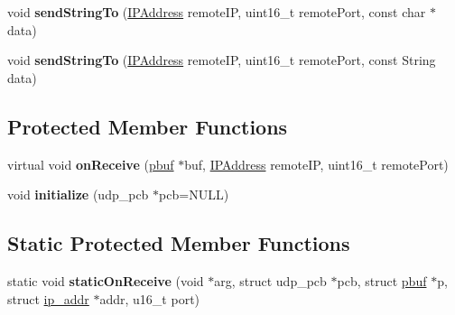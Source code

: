 \begin{DoxyCompactItemize}
\item 
\hypertarget{class_udp_connection_af6eaf8ee55a8dde7d77f0e3225692004}{}void {\bfseries send\+String\+To} (\hyperlink{class_i_p_address}{I\+P\+Address} remote\+I\+P, uint16\+\_\+t remote\+Port, const char $\ast$data)\label{class_udp_connection_af6eaf8ee55a8dde7d77f0e3225692004}

\item 
\hypertarget{class_udp_connection_a11d710290fea6107fa7b0bcc0f9a2832}{}void {\bfseries send\+String\+To} (\hyperlink{class_i_p_address}{I\+P\+Address} remote\+I\+P, uint16\+\_\+t remote\+Port, const String data)\label{class_udp_connection_a11d710290fea6107fa7b0bcc0f9a2832}

\end{DoxyCompactItemize}
\subsection*{Protected Member Functions}
\begin{DoxyCompactItemize}
\item 
\hypertarget{class_udp_connection_aeb5d93f38e7a0ed60752e7d7fa8fe8d7}{}virtual void {\bfseries on\+Receive} (\hyperlink{structpbuf}{pbuf} $\ast$buf, \hyperlink{class_i_p_address}{I\+P\+Address} remote\+I\+P, uint16\+\_\+t remote\+Port)\label{class_udp_connection_aeb5d93f38e7a0ed60752e7d7fa8fe8d7}

\item 
\hypertarget{class_udp_connection_ad47cb63f5cd5d4982df9e5b474da3bd4}{}void {\bfseries initialize} (udp\+\_\+pcb $\ast$pcb=N\+U\+L\+L)\label{class_udp_connection_ad47cb63f5cd5d4982df9e5b474da3bd4}

\end{DoxyCompactItemize}
\subsection*{Static Protected Member Functions}
\begin{DoxyCompactItemize}
\item 
\hypertarget{class_udp_connection_a017de3aa0769ee75b62c0476acca2a0f}{}static void {\bfseries static\+On\+Receive} (void $\ast$arg, struct udp\+\_\+pcb $\ast$pcb, struct \hyperlink{structpbuf}{pbuf} $\ast$p, struct \hyperlink{structip__addr}{ip\+\_\+addr} $\ast$addr, u16\+\_\+t port)\label{class_udp_connection_a017de3aa0769ee75b62c0476acca2a0f}

\end{DoxyCompactItemize}

